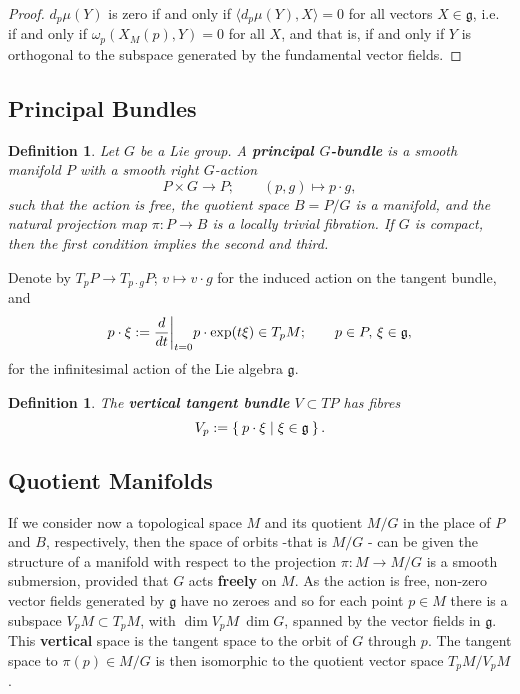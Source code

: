 \documentclass{article}
\newtheorem{defn}[theorem]{Definition\rm}
\newcommand{\ra}{\rightarrow}
\newcommand{\w}{\omega}
\newcommand{\mfg}{\mathfrak{g}}
\newcommand\restr[2]{{%
		\left.\kern-\nulldelimiterspace %
		#1 %
		\vphantom{\big|} %
		\right|_{#2} %
}}
\begin{document}
	\begin{proof}
		$d_{p}\mu(Y)$ is zero if and only if $\langle d_{p}\mu(Y), X \rangle = 0$ for all vectors $X \in \mfg$, i.e. if and only if $\w_{p}(X_{M}(p), Y) = 0$ for all $X$, and that is, if and only if $Y$ is orthogonal to the subspace generated by the fundamental vector fields.
	\end{proof}

	\subsection{Principal Bundles}
	
	\begin{defn}
		Let $G$ be a Lie group. A \textbf{principal $G$-bundle} is a smooth manifold $P$ with a smooth right $G$-action 
		\[
		P \times G \ra P; \qquad (p,g) \longmapsto p \cdot g,
		\]
		such that the action is free, the quotient space $B = P/G$ is a manifold, and the natural projection map $\pi : P \ra B$ is a locally trivial fibration. If $G$ is compact, then the first condition implies the second and third.
	\end{defn}
	
	Denote by $T_{p}P \ra T_{p\cdot g}P$; $v \mapsto v \cdot g$ for the induced action on the tangent bundle, and
	\[
		p \cdot \xi := \restr{\frac{d}{dt}}{t = 0} p \cdot \exp(t\xi) \in T_{p}M; \qquad p \in P,\, \xi \in \mfg,
	\]
	for the infinitesimal action of the Lie algebra $\mfg$. 
	
	\begin{defn}
		The \textbf{vertical tangent bundle} $V \subset TP$ has fibres
		\[
			V_{p} := \Set{ p \cdot \xi | \xi \in \mfg}.
		\]
	\end{defn}
	
	\subsection{Quotient Manifolds}
	
	If we consider now a topological space $M$ and its quotient $M/G$ in the place of $P$ and $B$, respectively, then the space of orbits -that is $M/G$ - can be given the structure of a manifold with respect to the projection $\pi : M \ra M/G$ is a smooth submersion, provided that $G$ acts \textbf{freely} on $M$. As the action is free, non-zero vector fields generated by $\mfg$ have no zeroes and so for each point $p \in M$ there is a subspace $V_{p}M \subset T_{p}M$, with $\dim V_{p}M \ \dim G$, spanned by the vector fields in $\mfg$. This \textbf{vertical} space is the tangent space to the orbit of $G$ through $p$. The tangent space to $\pi(p) \in M/G$ is then isomorphic to the quotient vector space $T_{p}M/V_{p}M$.
	
\end{document}
